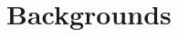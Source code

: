 \documentclass[10pt,leqno,twoside]{article}
\begin{document}



\section{Backgrounds}\label{Sect:Backgrounds}
\end{document}
